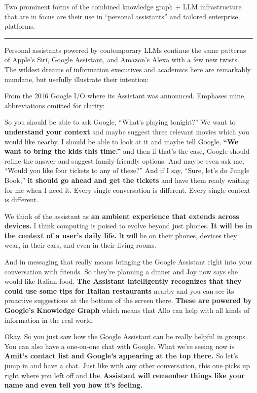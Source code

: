 Two prominent forms of the combined knowledge graph + LLM infrastructure
that are in focus are their use in ``personal assistants'' and tailored
enterprise platforms.

\begin{center}\rule{0.5\linewidth}{0.5pt}\end{center}

Personal assistants powered by contemporary LLMs continue the same
patterns of Apple's Siri, Google Assistant, and Amazon's Alexa with a
few new twists. The wildest dreams of information executives and
academics here are remarkably mundane, but usefully illustrate their
intention:

From the 2016 Google I/O where its Assistant was announced.
Emphases mine, abbreviations omitted for clarity:

\begin{leftbar}
So you should be able to ask Google, ``What's playing tonight?'' We want
to \textbf{understand your context} and maybe suggest three relevant
movies which you would like nearby. I should be able to look at it and
maybe tell Google, \textbf{``We want to bring the kids this time.''} and
then if that's the case, Google should refine the answer and suggest
family-friendly options. And maybe even ask me, ``Would you like four
tickets to any of these?'' And if I say, ``Sure, let's do Jungle Book,''
\textbf{it should go ahead and get the tickets} and have them ready
waiting for me when I need it. Every single conversation is different.
Every single context is different.

We think of the assistant as \textbf{an ambient experience that extends
across devices.} I think computing is poised to evolve beyond just
phones. \textbf{It will be in the context of a user's daily life.} It
will be on their phones, devices they wear, in their cars, and even in
their living rooms.

And in messaging that really means bringing the Google Assistant right
into your conversation with friends. So they're planning a dinner and
Joy now says she would like Italian food. \textbf{The Assistant
intelligently recognizes that they could use some tips for Italian
restaurants} nearby and you can see its proactive suggestions at the
bottom of the screen there. \textbf{These are powered by Google's
Knowledge Graph} which means that Allo can help with all kinds of
information in the real world.

Okay. So you just saw how the Google Assistant can be really helpful in
groups. You can also have a one-on-one chat with Google. What we're
seeing now is \textbf{Amit's contact list and Google's appearing at the
top there.} So let's jump in and have a chat. Just like with any other
conversation, this one picks up right where you left off and \textbf{the
Assistant will remember things like your name and even tell you how it's
feeling.} \cite{sGoogle2016Keynote2016} 
\end{leftbar}

